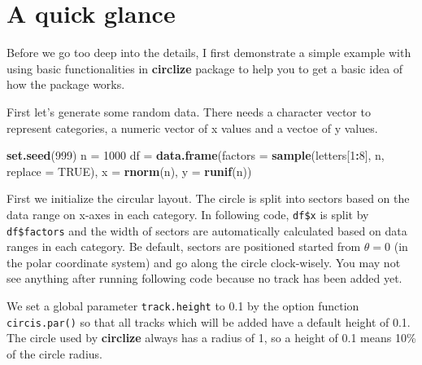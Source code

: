 \documentclass[]{book}
\newenvironment{Shaded}{\begin{snugshade}}{\end{snugshade}}
\newcommand{\KeywordTok}[1]{\textcolor[rgb]{0.13,0.29,0.53}{\textbf{#1}}}
\newcommand{\DataTypeTok}[1]{\textcolor[rgb]{0.13,0.29,0.53}{#1}}
\newcommand{\DecValTok}[1]{\textcolor[rgb]{0.00,0.00,0.81}{#1}}
\newcommand{\FloatTok}[1]{\textcolor[rgb]{0.00,0.00,0.81}{#1}}
\newcommand{\StringTok}[1]{\textcolor[rgb]{0.31,0.60,0.02}{#1}}
\newcommand{\OtherTok}[1]{\textcolor[rgb]{0.56,0.35,0.01}{#1}}
\newcommand{\OperatorTok}[1]{\textcolor[rgb]{0.81,0.36,0.00}{\textbf{#1}}}
\newcommand{\NormalTok}[1]{#1}
\begin{document}
\section{A quick glance}\label{a-qiuck-glance}

Before we go too deep into the details, I first demonstrate a simple
example with using basic functionalities in \textbf{circlize} package to
help you to get a basic idea of how the package works.

First let's generate some random data. There needs a character vector to
represent categories, a numeric vector of x values and a vectoe of y
values.

\begin{Shaded}
\begin{Highlighting}[]
\KeywordTok{set.seed}\NormalTok{(}\DecValTok{999}\NormalTok{)}
\NormalTok{n =}\StringTok{ }\DecValTok{1000}
\NormalTok{df =}\StringTok{ }\KeywordTok{data.frame}\NormalTok{(}\DataTypeTok{factors =} \KeywordTok{sample}\NormalTok{(letters[}\DecValTok{1}\OperatorTok{:}\DecValTok{8}\NormalTok{], n, }\DataTypeTok{replace =} \OtherTok{TRUE}\NormalTok{),}
    \DataTypeTok{x =} \KeywordTok{rnorm}\NormalTok{(n), }\DataTypeTok{y =} \KeywordTok{runif}\NormalTok{(n))}
\end{Highlighting}
\end{Shaded}

First we initialize the circular layout. The circle is split into
sectors based on the data range on x-axes in each category. In following
code, \texttt{df\$x} is split by \texttt{df\$factors} and the width of
sectors are automatically calculated based on data ranges in each
category. Be default, sectors are positioned started from \(\theta = 0\)
(in the polar coordinate system) and go along the circle clock-wisely.
You may not see anything after running following code because no track
has been added yet.

\begin{Shaded}
\end{Shaded}

We set a global parameter \texttt{track.height} to 0.1 by the option
function \texttt{circis.par()} so that all tracks which will be added
have a default height of 0.1. The circle used by \textbf{circlize}
always has a radius of 1, so a height of 0.1 means 10\% of the circle
radius.
\end{document}

